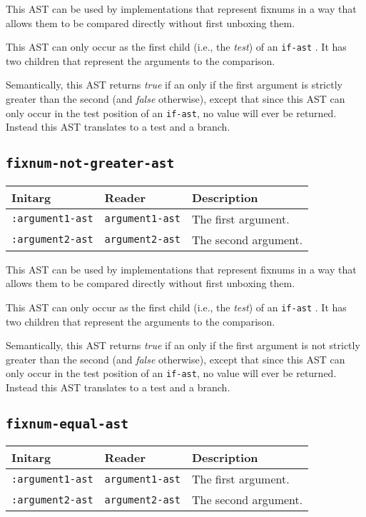 This AST can be used by implementations that represent fixnums in a
way that allows them to be compared directly without first unboxing
them.

This AST can only occur as the first child (i.e., the \emph{test}) of
an \texttt{if-ast} .  It has two children that
represent the arguments to the comparison.  

Semantically, this AST returns \emph{true} if an only if the first
argument is strictly greater than the second (and \emph{false}
otherwise), except that since this AST can only occur in the test
position of an \texttt{if-ast}, no value will ever be returned.
Instead this AST translates to a test and a branch. 

\subsection{\texttt{fixnum-not-greater-ast}}
\label{fixnum-not-greater-ast}

\begin{tabular}{|l|l|l|}
\hline
Initarg & Reader & Description\\
\hline\hline
\texttt{:argument1-ast} & \texttt{argument1-ast} & The first argument.\\
\hline
\texttt{:argument2-ast} & \texttt{argument2-ast} & The second argument.\\
\hline
\end{tabular}

This AST can be used by implementations that represent fixnums in a
way that allows them to be compared directly without first unboxing
them.

This AST can only occur as the first child (i.e., the \emph{test}) of
an \texttt{if-ast} .  It has two children that
represent the arguments to the comparison.  

Semantically, this AST returns \emph{true} if an only if the first
argument is not strictly greater than the second (and \emph{false}
otherwise), except that since this AST can only occur in the test
position of an \texttt{if-ast}, no value will ever be returned.
Instead this AST translates to a test and a branch. 

\subsection{\texttt{fixnum-equal-ast}}
\label{fixnum-equal-ast}

\begin{tabular}{|l|l|l|}
\hline
Initarg & Reader & Description\\
\hline\hline
\texttt{:argument1-ast} & \texttt{argument1-ast} & The first argument.\\
\hline
\texttt{:argument2-ast} & \texttt{argument2-ast} & The second argument.\\
\hline
\end{tabular}

